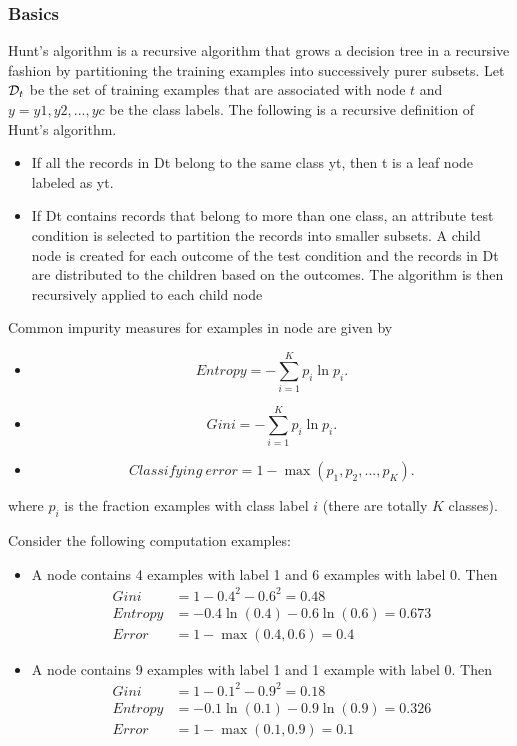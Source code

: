 \begin{refsection}
\subsubsection{Basics}


\begin{method}\cite[152]{tan2013introduction}
Hunt's algorithm is a recursive algorithm that grows a decision tree in a recursive fashion by partitioning the training examples into successively purer subsets. Let $\mathcal{D}_t$ be the set of training examples that are associated with node $t$ and $y = {y1, y2, . . . , yc}$ be
the class labels. The following is a recursive definition of Hunt's algorithm.
\begin{itemize}
	\item If all the records in Dt belong to the same class yt, then t is a leaf node labeled as yt.
	\item If Dt contains records that belong to more than one class, an attribute test condition is selected to partition the records into smaller subsets. A child node is created for each outcome of the test condition and the records in Dt are distributed to the children based on the outcomes. The algorithm is then recursively applied to each child node
\end{itemize}	
\end{method}

\begin{definition}
Common impurity measures for examples in node are given by
\begin{itemize}
	\item $$Entropy = -\sum_{i=1}^K p_i\ln p_i.$$
	\item $$Gini = -\sum_{i=1}^K p_i\ln p_i.$$
	\item $$Classifying~error = 1 - \max (p_1, p_2,...,p_K).$$
\end{itemize}	
where $p_i$ is the fraction examples with class label $i$ (there are totally $K$ classes).
\end{definition}


\begin{example}
Consider the following computation examples:
\begin{itemize}
	\item A node contains 4 examples with label 1 and 6 examples with label 0. Then
	\begin{align*}
	Gini &= 1 - 0.4^2 - 0.6^2 = 0.48 \\
	Entropy &= -0.4\ln(0.4) - 0.6\ln(0.6) = 0.673 \\
	Error &= 1 - \max(0.4,0.6) = 0.4 
	\end{align*}
	\item A node contains 9 examples with label 1 and 1 example with label 0. Then
	\begin{align*}
	Gini &= 1 - 0.1^2 - 0.9^2 = 0.18 \\
	Entropy &= -0.1\ln(0.1) - 0.9\ln(0.9) = 0.326 \\
	Error &= 1 - \max(0.1,0.9) = 0.1 
	\end{align*}
\end{itemize}
\end{example}



\end{refsection}
